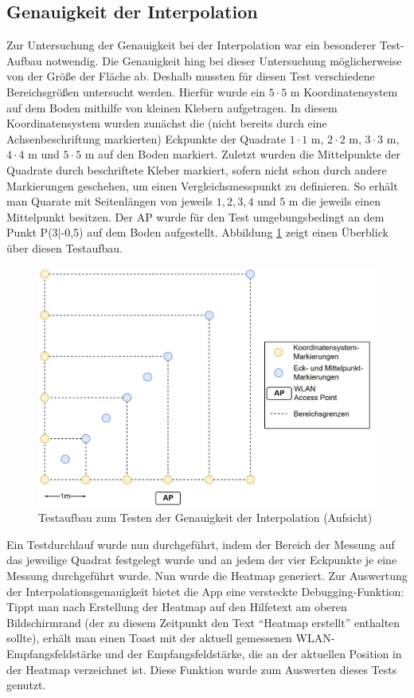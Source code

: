 \documentclass[10pt]{scrartcl}
\begin{document}
\subsection{Genauigkeit der Interpolation}
\label{InterpolationAccuracy}
Zur Untersuchung der Genauigkeit bei der Interpolation war ein besonderer Test-Aufbau notwendig. Die Genauigkeit hing bei dieser Untersuchung möglicherweise von der Größe der Fläche ab. Deshalb mussten für diesen Test verschiedene Bereichsgrößen untersucht werden. Hierfür wurde ein $5\cdot 5$ m Koordinatensystem auf dem Boden mithilfe von kleinen Klebern aufgetragen. In diesem Koordinatensystem wurden zunächst die (nicht bereits durch eine Achsenbeschriftung markierten) Eckpunkte der Quadrate $1\cdot 1$ m, $2\cdot 2$ m, $3\cdot 3$ m, $4\cdot 4$ m und $5\cdot 5$ m auf den Boden markiert. Zuletzt wurden die Mittelpunkte der Quadrate durch beschriftete Kleber markiert, sofern nicht schon durch andere Markierungen geschehen, um einen Vergleichsmesspunkt zu definieren. So erhält man Quarate mit Seitenlängen von jeweils $1, 2, 3, 4$ und $5$ m die jeweils einen Mittelpunkt besitzen. Der AP wurde für den Test umgebungsbedingt an dem Punkt P(3|-0,5) auf dem Boden aufgestellt. Abbildung \ref{img:accuracy} zeigt einen Überblick über diesen Testaufbau.

\begin{figure}
\centering
\includegraphics[scale=0.25]{images/testaufbau_interpolationsgenauigkeit.jpg}
\caption{\label{img:accuracy}Testaufbau zum Testen der Genauigkeit der Interpolation (Aufsicht)}
\end{figure}

Ein Testdurchlauf wurde nun durchgeführt, indem der Bereich der Messung auf das jeweilige Quadrat festgelegt wurde und an jedem der vier Eckpunkte je eine Messung durchgeführt wurde. Nun wurde die Heatmap generiert. Zur Auswertung der Interpolationsgenauigkeit bietet die App eine versteckte Debugging-Funktion: Tippt man nach Erstellung der Heatmap auf den Hilfetext am oberen Bildschirmrand (der zu diesem Zeitpunkt den Text \enquote{Heatmap erstellt} enthalten sollte), erhält man einen Toast mit der aktuell gemessenen WLAN-Empfangsfeldstärke und der Empfangsfeldstärke, die an der aktuellen Position in der Heatmap verzeichnet ist. Diese Funktion wurde zum Auswerten dieses Tests genutzt.
\end{document}
